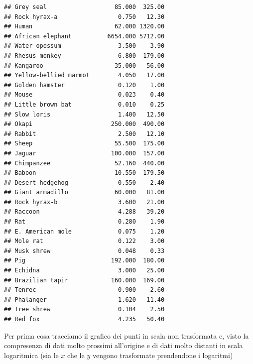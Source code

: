 \documentclass[onecolumn,12pt]{book}\usepackage[]{graphicx}\usepackage[]{color}
\makeatletter
\newenvironment{kframe}{%
 \def\at@end@of@kframe{}%
 \ifinner\ifhmode%
  \def\at@end@of@kframe{\end{minipage}}%
  \begin{minipage}{\columnwidth}%
 \fi\fi%
 \def\FrameCommand##1{\hskip\@totalleftmargin \hskip-\fboxsep
 \colorbox{shadecolor}{##1}\hskip-\fboxsep
     \hskip-\linewidth \hskip-\@totalleftmargin \hskip\columnwidth}%
 \MakeFramed {\advance\hsize-\width
   \@totalleftmargin\z@ \linewidth\hsize
   \@setminipage}}%
 {\par\unskip\endMakeFramed%
 \at@end@of@kframe}
\newenvironment{knitrout}{}{} %
\makeatother
\begin{document}
\begin{knitrout}
\begin{kframe}
\begin{verbatim}
## Grey seal                   85.000  325.00
## Rock hyrax-a                 0.750   12.30
## Human                       62.000 1320.00
## African elephant          6654.000 5712.00
## Water opossum                3.500    3.90
## Rhesus monkey                6.800  179.00
## Kangaroo                    35.000   56.00
## Yellow-bellied marmot        4.050   17.00
## Golden hamster               0.120    1.00
## Mouse                        0.023    0.40
## Little brown bat             0.010    0.25
## Slow loris                   1.400   12.50
## Okapi                      250.000  490.00
## Rabbit                       2.500   12.10
## Sheep                       55.500  175.00
## Jaguar                     100.000  157.00
## Chimpanzee                  52.160  440.00
## Baboon                      10.550  179.50
## Desert hedgehog              0.550    2.40
## Giant armadillo             60.000   81.00
## Rock hyrax-b                 3.600   21.00
## Raccoon                      4.288   39.20
## Rat                          0.280    1.90
## E. American mole             0.075    1.20
## Mole rat                     0.122    3.00
## Musk shrew                   0.048    0.33
## Pig                        192.000  180.00
## Echidna                      3.000   25.00
## Brazilian tapir            160.000  169.00
## Tenrec                       0.900    2.60
## Phalanger                    1.620   11.40
## Tree shrew                   0.104    2.50
## Red fox                      4.235   50.40
\end{verbatim}
\end{kframe}
\end{knitrout}
Per prima cosa tracciamo il grafico dei punti  in scala non trasformata e, visto la compresenza di dati molto prossimi all'origine e di dati molto distanti in scala logaritmica (sia le $x$ che le $y$ vengono trasformate prendendone i logaritmi)
\end{document}
